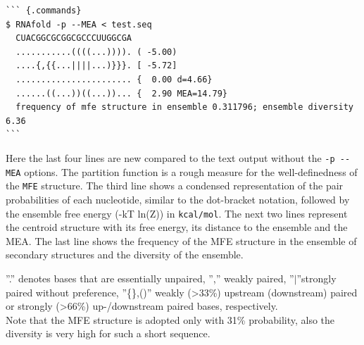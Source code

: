 \documentclass[]{article}
\begin{document}
\begin{verbatim}
``` {.commands}
$ RNAfold -p --MEA < test.seq
  CUACGGCGCGGCGCCCUUGGCGA
  ...........((((...)))). ( -5.00)
  ....{,{{...||||...)}}}. [ -5.72]
  ....................... {  0.00 d=4.66}
  ......((...))((...))... {  2.90 MEA=14.79}
  frequency of mfe structure in ensemble 0.311796; ensemble diversity 6.36
```
\end{verbatim}

Here the last four lines are new compared to the text output without the
\texttt{-p\ -\/-MEA} options. The partition function is a rough measure
for the well-definedness of the \texttt{MFE} structure. The third line
shows a condensed representation of the pair probabilities of each
nucleotide, similar to the dot-bracket notation, followed by the
ensemble free energy (-kT ln(Z)) in \texttt{kcal/mol}. The next two
lines represent the centroid structure with its free energy, its
distance to the ensemble and the MEA. The last line shows the frequency
of the MFE structure in the ensemble of secondary structures and the
diversity of the ensemble.

''.'' denotes bases that are essentially unpaired, '','' weakly paired,
''\(|\)''strongly paired without preference, ''\{\},()'' weakly
(\textgreater{}33\%) upstream (downstream) paired or strongly (\textgreater{}66\%)
up-/downstream paired bases, respectively.\\
 Note that the MFE structure is adopted only with 31\% probability, also
the diversity is very high for such a short sequence.\\
\end{document}
